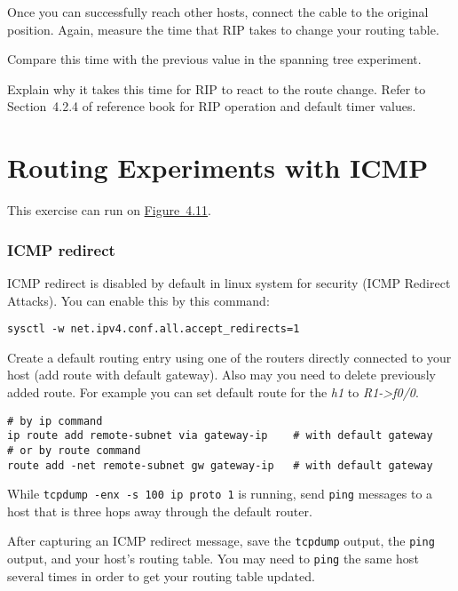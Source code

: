 \documentclass{../UTNetLab}
\begin{document}
    Once you can successfully reach other hosts, connect the cable to the original position.
    Again, measure the time that RIP takes to change your routing table.
    
    \begin{report}
        \item Compare this time with the previous value in the spanning tree experiment.

        \item Explain why it takes this time for RIP to react to the route change.
            Refer to Section~4.2.4 of reference book for RIP operation and default timer values.
    \end{report}


\part{Routing Experiments with ICMP}
    This exercise can run on \hyperref[fig:4.11]{Figure~4.11}.

\section{ICMP redirect}
    ICMP redirect is disabled by default in linux system for security (ICMP Redirect Attacks).
    You can enable this by this command:
    \begin{lstlisting}
sysctl -w net.ipv4.conf.all.accept_redirects=1
    \end{lstlisting}

    Create a default routing entry using one of the routers directly connected to your host (add route with default gateway).
    Also may you need to delete previously added route.
    For example you can set default route for the \textit{h1} to \textit{R1->f0/0}.

    \begin{lstlisting}[emph={eth0,gateway-ip,remote-subnet},morekeywords={[3]add,dev,via,gw}]
# by ip command
ip route add remote-subnet via gateway-ip    # with default gateway
# or by route command
route add -net remote-subnet gw gateway-ip   # with default gateway
    \end{lstlisting}

    While \lstinline[morekeywords={[3]ip,proto}]{tcpdump -enx -s 100 ip proto 1} is running, send \lstinline{ping} messages to a host that is three hops away through the default router.

    After capturing an ICMP redirect message, save the \lstinline{tcpdump} output, the \lstinline{ping} output, and your host’s routing table.
    You may need to \lstinline{ping} the same host several times in order to get your routing table updated.
    
\end{document}
